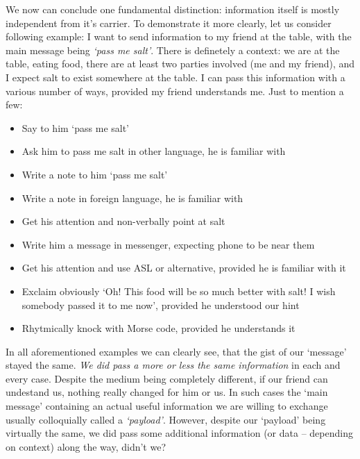\documentclass{article}
\begin{document}
            We now can conclude one fundamental distinction: information itself is mostly independent from it's carrier. To demonstrate it more clearly, let us consider
            following example: I want to send information to my friend at the table, with the main message being \emph{`pass me salt'}. There is definetely a context:
            we are at the table, eating food, there are at least two parties involved (me and my friend), and I expect salt to exist somewhere at the table. I can pass this 
            information with a various number of ways, provided my friend understands me. Just to mention a few:

            \begin{itemize}
                \item Say to him `pass me salt'
                \item Ask him to pass me salt in other language, he is familiar with
                \item Write a note to him `pass me salt'
                \item Write a note in foreign language, he is familiar with
                \item Get his attention and non-verbally point at salt
                \item Write him a message in messenger, expecting phone to be near them
                \item Get his attention and use ASL or alternative, provided he is familiar with it
                \item Exclaim obviously `Oh! This food will be so much better with salt! I wish somebody passed it to me now', provided he understood our hint
                \item Rhytmically knock with Morse code, provided he understands it
            \end{itemize}

            In all aforementioned examples we can clearly see, that the gist of our `message' stayed the same. \emph{We did pass a more or less the same information} in 
            each and every case. Despite the medium being completely different, if our friend can undestand us, nothing really changed for him or us. In such cases
            the `main message' containing an actual useful information we are willing to exchange usually colloquially called a \emph{`payload'}. However,
            despite our `payload' being virtually the same, we did pass some additional information (or data -- depending on context) along the way, didn't we?
\end{document}
